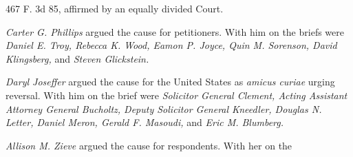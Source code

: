 
\setcounter{page}{440}

467 F. 3d 85, affirmed by an equally divided Court.

  \emph{Carter G. Phillips} argued the cause for petitioners. With him on
the briefs were \emph{Daniel E. Troy, Rebecca K. Wood, Eamon P. Joyce, Quin
M. Sorenson, David Klingsberg,} and \emph{Steven Glickstein.}

  \emph{Daryl Joseffer} argued the cause for the United States as \emph{amicus
curiae} urging reversal. With him on the brief were \emph{Solicitor General
Clement, Acting Assistant Attorney General Bucholtz, Deputy Solicitor
General Kneedler, Douglas N. Letter, Daniel Meron, Gerald F. Masoudi,}
and \emph{Eric M. Blumberg.}

  \emph{Allison M. Zieve} argued the cause for respondents. With her on the
